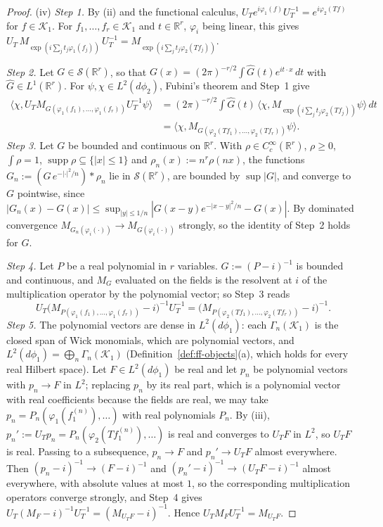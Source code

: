 \documentclass[11pt,a4paper]{article}
\theoremstyle{plain}
\theoremstyle{definition}
\theoremstyle{plain}
\theoremstyle{definition}
\newcommand{\R}{\mathbb{R}}
\newcommand{\ip}[2]{\langle #1,#2\rangle}
\DeclareMathOperator{\supp}{supp}
\begin{document}
\begin{proof}
(iv) \emph{Step 1.}  By (ii) and the functional calculus, $U_Te^{i\varphi_1(f)}U_T^{-1}=
e^{i\varphi_2(Tf)}$ for $f\in\mathcal K_1$.  For $f_1,\dots,f_r\in\mathcal K_1$ and $t\in\R^r$,
$\varphi_i$ being linear, this gives $U_T\,M_{\exp(i\sum_jt_j\varphi_1(f_j))}\,U_T^{-1}=
M_{\exp(i\sum_jt_j\varphi_2(Tf_j))}$.

\emph{Step 2.}  Let $G\in\mathcal S(\R^r)$, so that $G(x)=(2\pi)^{-r/2}\int\hat G(t)e^{it\cdot
x}\,dt$ with $\hat G\in L^1(\R^r)$.  For $\psi,\chi\in L^2(d\phi_2)$, Fubini's theorem and
Step~1 give
\begin{align*}
 \ip\chi{U_TM_{G(\varphi_1(f_1),\dots,\varphi_1(f_r))}U_T^{-1}\psi}
 &=(2\pi)^{-r/2}\!\int\!\hat G(t)\,\ip\chi{M_{\exp(i\sum_jt_j\varphi_2(Tf_j))}\psi}\,dt\\
 &=\ip\chi{M_{G(\varphi_2(Tf_1),\dots,\varphi_2(Tf_r))}\psi} .
\end{align*}
\emph{Step 3.}  Let $G$ be bounded and continuous on $\R^r$.  With $\rho\in C_c^\infty(\R^r)$,
$\rho\ge0$, $\int\rho=1$, $\supp\rho\subseteq\{|x|\le1\}$ and $\rho_n(x):=n^r\rho(nx)$, the
functions $G_n:=(G\,e^{-|\cdot|^2/n})*\rho_n$ lie in $\mathcal S(\R^r)$, are bounded by
$\sup|G|$, and converge to $G$ pointwise, since $|G_n(x)-G(x)|\le\sup_{|y|\le1/n}
|G(x-y)e^{-|x-y|^2/n}-G(x)|$.  By dominated convergence $M_{G_n(\varphi_i(\cdot))}\to
M_{G(\varphi_i(\cdot))}$ strongly, so the identity of Step~2 holds for $G$.

\emph{Step 4.}  Let $P$ be a real polynomial in $r$ variables.  $G:=(P-i)^{-1}$ is bounded and
continuous, and $M_G$ evaluated on the fields is the resolvent at $i$ of the multiplication
operator by the polynomial vector; so Step~3 reads
\[
 U_T\bigl(M_{P(\varphi_1(f_1),\dots,\varphi_1(f_r))}-i\bigr)^{-1}U_T^{-1}
 =\bigl(M_{P(\varphi_2(Tf_1),\dots,\varphi_2(Tf_r))}-i\bigr)^{-1} .
\]
\emph{Step 5.}  The polynomial vectors are dense in $L^2(d\phi_1)$: each $\Gamma_n(\mathcal
K_1)$ is the closed span of Wick monomials, which are polynomial vectors, and $L^2(d\phi_1)=
\bigoplus_n\Gamma_n(\mathcal K_1)$ (Definition~\ref{def:ff-objects}(a), which holds for every
real Hilbert space).  Let $F\in L^2(d\phi_1)$ be real and let $p_n$ be polynomial vectors with
$p_n\to F$ in $L^2$; replacing $p_n$ by its real part, which is a polynomial vector with real
coefficients because the fields are real, we may take $p_n=P_n(\varphi_1(f^{(n)}_1),\dots)$ with
real polynomials $P_n$.  By (iii), $p_n':=U_Tp_n=P_n(\varphi_2(Tf^{(n)}_1),\dots)$ is real and
converges to $U_TF$ in $L^2$, so $U_TF$ is real.  Passing to a subsequence, $p_n\to F$ and
$p_n'\to U_TF$ almost everywhere.  Then $(p_n-i)^{-1}\to(F-i)^{-1}$ and
$(p_n'-i)^{-1}\to(U_TF-i)^{-1}$ almost everywhere, with absolute values at most $1$, so the
corresponding multiplication operators converge strongly, and Step~4 gives
$U_T(M_F-i)^{-1}U_T^{-1}=(M_{U_TF}-i)^{-1}$.  Hence $U_TM_FU_T^{-1}=M_{U_TF}$.


\end{proof}
\end{document}
